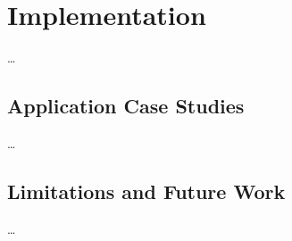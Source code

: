 \chapter{Implementation} \label{ch:Implementation}

\dots

\section{Application Case Studies}

\dots


\section{Limitations and Future Work}

\dots
